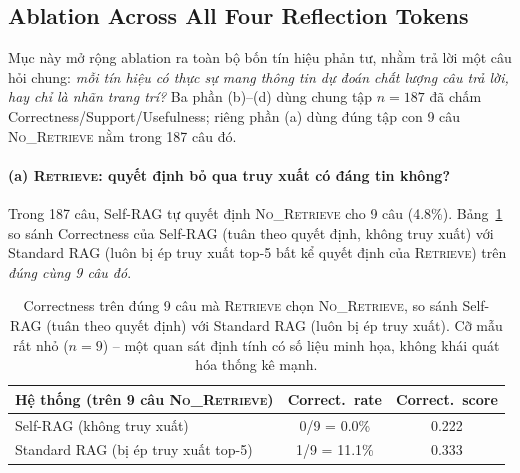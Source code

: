 \documentclass[11pt]{article}
\begin{document}
\subsection{Ablation Across All Four Reflection Tokens}
\label{sec:full-ablation}

Mục này mở rộng ablation ra toàn bộ bốn tín hiệu phản tư, nhằm trả lời một câu hỏi chung: \emph{mỗi tín hiệu có thực sự mang thông tin dự đoán chất lượng câu trả lời, hay chỉ là nhãn trang trí?} Ba phần (b)--(d) dùng chung tập $n=187$ đã chấm Correctness/Support/Usefulness; riêng phần (a) dùng đúng tập con 9 câu \textsc{No\_Retrieve} nằm trong 187 câu đó.

\paragraph{(a) \textsc{Retrieve}: quyết định bỏ qua truy xuất có đáng tin không?}
Trong 187 câu, Self-RAG tự quyết định \textsc{No\_Retrieve} cho 9 câu (4.8\%). Bảng~\ref{tab:retrieve-ablation} so sánh Correctness của Self-RAG (tuân theo quyết định, không truy xuất) với Standard RAG (luôn bị ép truy xuất top-5 bất kể quyết định của \textsc{Retrieve}) trên \emph{đúng cùng 9 câu đó}.

\begin{table}[t]
\centering
\small
\begin{tabular}{@{}lcc@{}}
\toprule
\textbf{Hệ thống (trên 9 câu \textsc{No\_Retrieve})} & \textbf{Correct.\ rate} & \textbf{Correct.\ score} \\
\midrule
Self-RAG (không truy xuất) & 0/9 = 0.0\% & 0.222 \\
Standard RAG (bị ép truy xuất top-5) & 1/9 = 11.1\% & 0.333 \\
\bottomrule
\end{tabular}
\caption{Correctness trên đúng 9 câu mà \textsc{Retrieve} chọn \textsc{No\_Retrieve}, so sánh Self-RAG (tuân theo quyết định) với Standard RAG (luôn bị ép truy xuất). Cỡ mẫu rất nhỏ ($n=9$) -- một quan sát định tính có số liệu minh họa, không khái quát hóa thống kê mạnh.}
\label{tab:retrieve-ablation}
\end{table}
\end{document}
